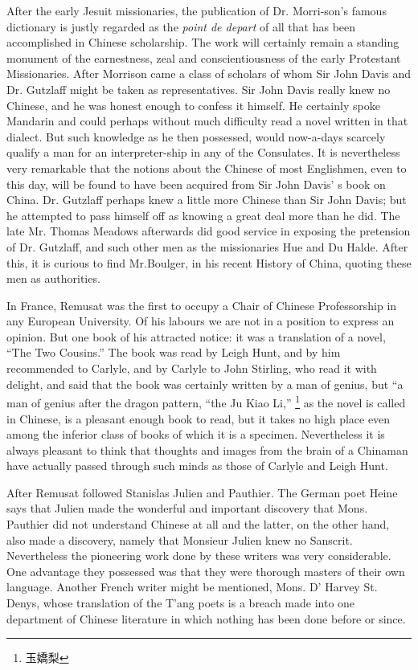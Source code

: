 After the early Jesuit missionaries, the publication of Dr. Morri-son's famous dictionary is justly regarded as the \emph{point de depart} of all that has been accomplished in Chinese scholarship.
The work will certainly remain a standing monument of the earnestness, zeal and conscientiousness of the early Protestant Missionaries.
After Morrison came a class of scholars of whom Sir John Davis and Dr. Gutzlaff might be taken as representatives.
Sir John Davis really knew no Chinese,
and he was honest enough to confess it himself.
He certainly spoke Mandarin and could perhaps without much difficulty read a novel written in that dialect.
But such knowledge as he then possessed,
would now-a-days scarcely qualify a man for an interpreter-ship in any of the Consulates.
It is nevertheless very remarkable that the notions about the Chinese of most Englishmen,
even to this day, will be found to have been acquired from Sir John Davis' s book on China.
Dr. Gutzlaff perhaps knew a little more Chinese than Sir John Davis;
but he attempted to pass himself off as knowing a great deal more than he did.
The late Mr. Thomas Meadows afterwards did good service in exposing the pretension of Dr. Gutzlaff,
and such other men as the missionaries Hue and Du Halde.
After this, it is curious to find Mr.Boulger, in his recent History of China,
quoting these men as authorities.

In France, Remusat was the first to occupy a Chair of Chinese Professorship in any European University.
Of his labours we are not in a position to express an opinion.
But one book of his attracted notice: it was a translation of a novel,
``The Two Cousins.''
The book was read by Leigh Hunt, and by him recommended to Carlyle,
and by Carlyle to John Stirling,
who read it with delight, and said that the book was certainly written by a man of genius,
but ``a man of genius after the dragon pattern,
``the Ju Kiao Li,'' \footnote{玉嬌梨}
as the novel is called in Chinese, is a pleasant enough book to read,
but it takes no high place even among the inferior class of books of which it is a specimen.
Nevertheless it is always pleasant to think that thoughts and images from the brain of a Chinaman have actually passed through such minds as those of Carlyle and Leigh Hunt.

After Remusat followed Stanislas Julien and Pauthier.
The German poet Heine says that Julien made the wonderful and important discovery that Mons. Pauthier did not understand Chinese at all and the latter,
on the other hand, also made a discovery, namely that Monsieur Julien knew no Sanscrit.
Nevertheless the pioneering work done by these writers was very considerable.
One advantage they possessed was that they were thorough masters of their own language.
Another French writer might be mentioned, Mons. D' Harvey St. Denys,
whose translation of the T'ang poets is a breach made into one department of Chinese literature in which nothing has been done before or since.

